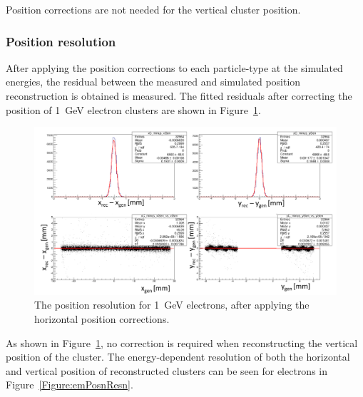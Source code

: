 Position corrections are not needed for the vertical cluster position.

\subsubsection{Position resolution}

After applying the position corrections to each particle-type at the simulated energies, the residual between the measured and simulated position reconstruction is obtained is measured. The fitted residuals after correcting the position of 1~GeV electron clusters are shown in Figure~\ref{Figure:corrPosnsFits}.

\begin{figure}[H]
  \centering
      \includegraphics[width=1.0\textwidth]{pics/performance/corrPosnsFits.png}
  \caption[Position resolution for 1~GeV electrons.]{The position resolution for 1~GeV electrons, after applying the horizontal position corrections.}
  \label{Figure:corrPosnsFits}
\end{figure}

As shown in Figure~\ref{Figure:corrPosnsFits}, no correction is required when reconstructing the vertical position of the cluster. The energy-dependent resolution of both the horizontal and vertical position of reconstructed clusters can be seen for electrons in Figure~\ref{Figure:emPosnResn}. 

